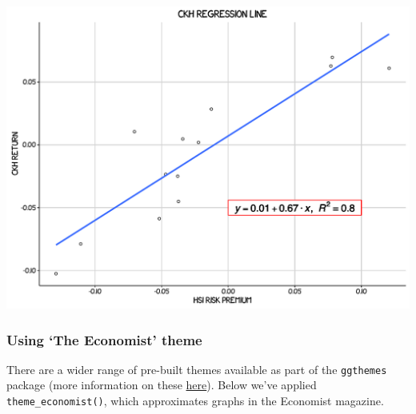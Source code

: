 \documentclass[]{article}
\begin{document}
\begin{center}\includegraphics{0_all_posts_pdf/lr_15-1} \end{center}

\subsubsection{\texorpdfstring{Using `The Economist'
theme}{Using The Economist theme}}\label{using-the-economist-theme-10}

There are a wider range of pre-built themes available as part of the
\texttt{ggthemes} package (more information on these
\href{https://cran.r-project.org/web/packages/ggthemes/vignettes/ggthemes.html}{here}).
Below we've applied \texttt{theme\_economist()}, which approximates
graphs in the Economist magazine.
\end{document}
